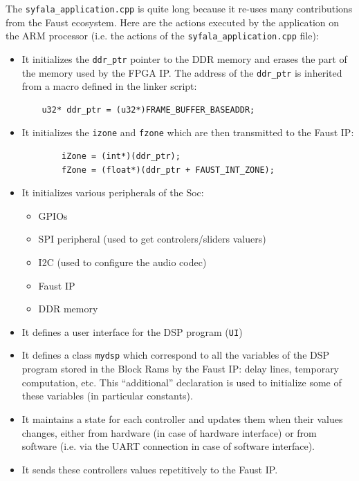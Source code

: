\documentclass[11pt]{article}
\numberwithin{equation}{section}
\numberwithin{figure}{section}
\begin{document}
The   {\tt syfala\_application.cpp} is quite long because it re-uses many contributions from the Faust ecosystem. Here are the actions executed by the application on the ARM processor (i.e. the actions of the {\tt syfala\_application.cpp} file):
  \begin{itemize}
  \item It initializes the {\tt ddr\_ptr} pointer to the DDR memory and erases the part of the memory used by the FPGA IP. The address of the {\tt ddr\_ptr} is  inherited from a macro defined in the linker script: 
\begin{verbatim}
    u32* ddr_ptr = (u32*)FRAME_BUFFER_BASEADDR;
\end{verbatim}

\item It initializes the {\tt izone} and {\tt fzone} which are then transmitted to the Faust IP:
\begin{verbatim}
        iZone = (int*)(ddr_ptr);
        fZone = (float*)(ddr_ptr + FAUST_INT_ZONE);
\end{verbatim}
\item It initializes various peripherals of the Soc:
  \begin{itemize}
  \item GPIOs
  \item SPI peripheral (used to get controlers/sliders valuers)
  \item I2C (used to configure the audio codec)
  \item Faust IP
  \item DDR memory
  \end{itemize}
\item It defines a user interface for the DSP program ({\tt UI})
\item It defines a class {\tt mydsp} which correspond to all the variables of the DSP program  stored in the Block Rams by the Faust IP: delay lines, temporary computation, etc. This ``additional'' declaration is used to initialize some of these variables (in particular constants).
  \item It maintains a state for each controller and updates them when their values changes, either from hardware (in case of hardware interface) or from software (i.e. via the UART connection in case of software interface).
  \item It sends these controllers values repetitively to the Faust IP.
  \end{itemize}
\end{document}
